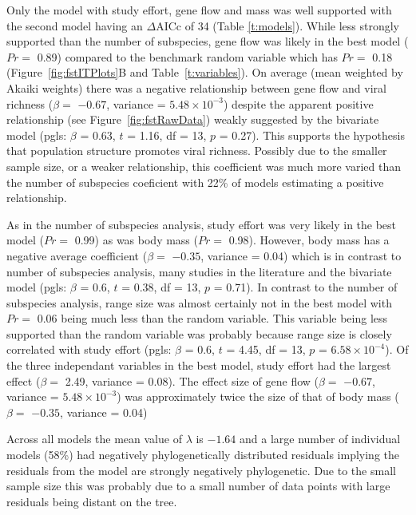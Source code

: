 
Only the model with study effort, gene flow and mass was well supported with the second model having an $\Delta\text{AICc}$ of 34 (Table \ref{t:models}).
While less strongly supported than the number of subspecies, gene flow was likely in the best model ($Pr = $ 0.89) compared to the benchmark random variable which has $Pr = $ 0.18 (Figure~\ref{fig:fstITPlots}B and Table~\ref{t:variables}).
On average (mean weighted by Akaiki weights) there was a negative relationship between gene flow and viral richness ($\beta = $ \ensuremath{-0.67}, variance = \ensuremath{5.48\times 10^{-3}}) despite the apparent positive relationship (see Figure~\ref{fig:fstRawData}) weakly suggested by the bivariate model (pgls: $\beta$ = 0.63, $t$ = 1.16, df = 13, $p$ = 0.27).
This supports the hypothesis that population structure promotes viral richness.
Possibly due to the smaller sample size, or a weaker relationship, this coefficient was much more varied than the number of subspecies coeficient with 22\% of models estimating a positive relationship.

As in the number of subspecies analysis, study effort was very likely in the best model ($Pr = $ 0.99) as was body mass ($Pr = $ 0.98).
However, body mass has a negative average coefficient ($\beta = $ \ensuremath{-0.35}, variance = 0.04) which is in contrast to number of subspecies analysis, many studies in the literature \cite{kamiya2014determines, turmelle2009correlates, gay2014parasite, maganga2014bat} and the bivariate model (pgls: $\beta$ = 0.6, $t$ = 0.38, df = 13, $p$ = 0.71).
In contrast to the number of subspecies analysis, range size was almost certainly not in the best model with $Pr = $ 0.06 being much less than the random variable.
This variable being less supported than the random variable was probably because range size is closely correlated with study effort (pgls: $\beta$ = 0.6, $t$ = 4.45, df = 13, $p$ = \ensuremath{6.58\times 10^{-4}}).
Of the three independant variables in the best model, study effort had the largest effect ($\beta = $ 2.49, variance = 0.08).
The effect size of gene flow ($\beta = $ \ensuremath{-0.67}, variance = \ensuremath{5.48\times 10^{-3}}) was approximately twice the size of that of body mass ($\beta = $ \ensuremath{-0.35}, variance = 0.04)

Across all models the mean value of $\lambda$ is \ensuremath{-1.64} and a large number of individual models (58\%)  had negatively phylogenetically distributed residuals implying the residuals from the model are strongly negatively phylogenetic.
Due to the small sample size this was probably due to a small number of data points with large residuals being distant on the tree.






